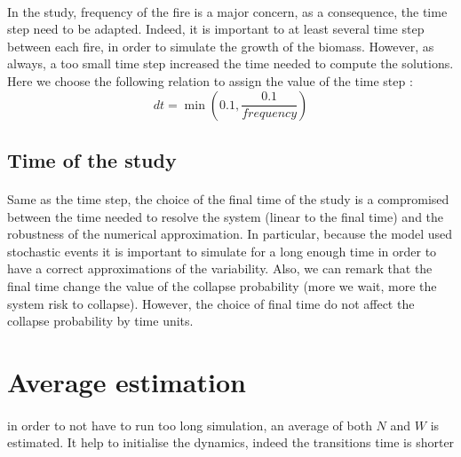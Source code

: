 \documentclass{article}
\begin{document}
\paragraph{}
In the study, frequency of the fire is a major concern, as a consequence, the time step need to be adapted. Indeed, it is important to at least several time step between each fire, in order to simulate the growth of the biomass. However, as always, a too small time step increased the time needed to compute the solutions. Here we choose the following relation to assign the value of the time step :
\[
dt = \min(0.1, \frac{0.1}{frequency})
\]



\subsection{Time of the study}

\paragraph{}
Same as the time step, the choice of the final time of the study is a compromised between the time needed to resolve the system (linear to the final time) and the robustness of the numerical approximation. In particular, because the model used stochastic events it is important to simulate for a long enough time in order to have a correct approximations of the variability.
Also, we can remark that the final time change the value of the collapse probability (more we wait, more the system risk to collapse). However, the choice of final time do not affect the collapse probability by time units.


\newpage
\section{Average estimation}
\label{average}

\paragraph{}
in order to not have to run too long simulation, an average of both $N$ and $W$ is estimated. It help to initialise the dynamics, indeed the transitions time is shorter
\end{document}
